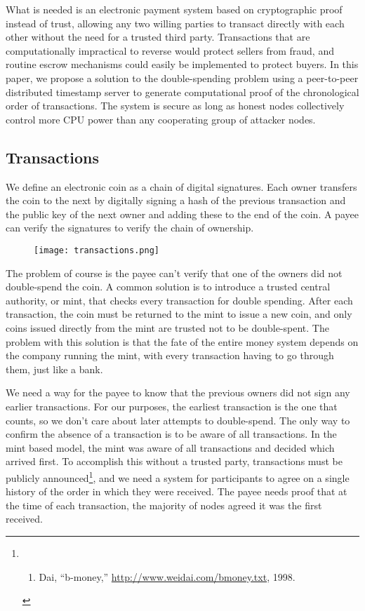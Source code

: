 What is needed is an electronic payment system based on cryptographic
proof instead of trust, allowing any two willing parties to transact
directly with each other without the need for a trusted third party.
Transactions that are computationally impractical to reverse would
protect sellers from fraud, and routine escrow mechanisms could easily
be implemented to protect buyers. In this paper, we propose a solution
to the double-spending problem using a peer-to-peer distributed
timestamp server to generate computational proof of the chronological
order of transactions. The system is secure as long as honest nodes
collectively control more CPU power than any cooperating group of
attacker nodes.

\subsection{Transactions}\label{transactions}

We define an electronic coin as a chain of digital signatures. Each
owner transfers the coin to the next by digitally signing a hash of the
previous transaction and the public key of the next owner and adding
these to the end of the coin. A payee can verify the signatures to
verify the chain of ownership.

\begin{figure}
\centering
\texttt{[image: transactions.png]}
\caption{}
\end{figure}

The problem of course is the payee can't verify that one of the owners
did not double-spend the coin. A common solution is to introduce a
trusted central authority, or mint, that checks every transaction for
double spending. After each transaction, the coin must be returned to
the mint to issue a new coin, and only coins issued directly from the
mint are trusted not to be double-spent. The problem with this solution
is that the fate of the entire money system depends on the company
running the mint, with every transaction having to go through them, just
like a bank.

We need a way for the payee to know that the previous owners did not
sign any earlier transactions. For our purposes, the earliest
transaction is the one that counts, so we don't care about later
attempts to double-spend. The only way to confirm the absence of a
transaction is to be aware of all transactions. In the mint based model,
the mint was aware of all transactions and decided which arrived first.
To accomplish this without a trusted party, transactions must be
publicly announced\footnote{\begin{enumerate}
  \def\labelenumi{\Alph{enumi}.}
  \setcounter{enumi}{22}
  \tightlist
  \item
    Dai, ``b-money,'' \url{http://www.weidai.com/bmoney.txt}, 1998.
  \end{enumerate}}, and we need a system for participants to agree on a
single history of the order in which they were received. The payee needs
proof that at the time of each transaction, the majority of nodes agreed
it was the first received.

